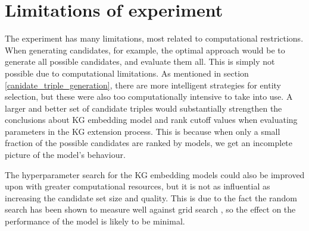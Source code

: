 \section{Limitations of experiment}
\label{experiment_limitations}
The experiment has many limitations, most related to computational restrictions. When generating candidates, for example, the optimal approach would be to generate all possible candidates, and evaluate them all. This is simply not possible due to computational limitations. As mentioned in section \ref{canidate_triple_generation}, there are more intelligent strategies for entity selection, but these were also too computationally intensive to take into use. A larger and better set of candidate triples would substantially strengthen the conclusions about KG embedding model and rank cutoff values when evaluating parameters in the KG extension process. This is because when only a small fraction of the possible candidates are ranked by models, we get an incomplete picture of the model's behaviour.

The hyperparameter search for the KG embedding models could also be improved upon with greater computational resources, but it is not as influential as increasing the candidate set size and quality. This is due to the fact the random search has been shown to measure well against grid search \cite{li2017hyperband}, so the effect on the performance of the model is likely to be minimal.